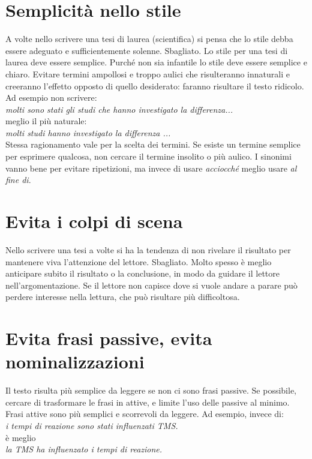 \documentclass[12pt]{book}
\begin{document}
\section{Semplicità nello stile}
A volte nello scrivere una tesi di laurea (scientifica) si pensa che lo stile debba essere adeguato e sufficientemente solenne. Sbagliato. Lo stile per una tesi di laurea deve essere semplice. Purché non sia infantile lo stile deve essere semplice e chiaro. Evitare termini ampollosi e troppo aulici che risulteranno innaturali e creeranno l'effetto opposto di quello desiderato: faranno risultare il testo ridicolo.\\
Ad esempio non scrivere:\\
\newline
\indent \emph{molti sono stati gli studi che hanno investigato la differenza...}\\
\newline
meglio il più naturale:\\
\newline
\indent \emph{molti studi hanno investigato la differenza ...}\\
\newline
Stessa ragionamento vale per la scelta dei termini. Se esiste un termine semplice per esprimere qualcosa, non cercare il termine insolito o più aulico. I sinonimi vanno bene per evitare ripetizioni, ma invece di usare \emph{acciocché} meglio usare \emph{al fine di}.

\section{Evita i colpi di scena}
Nello scrivere una tesi a volte si ha la tendenza di non rivelare il risultato per mantenere viva l'attenzione del lettore. Sbagliato. Molto spesso è meglio anticipare subito il risultato o la conclusione, in modo da guidare il lettore nell'argomentazione. Se il lettore non capisce dove si vuole andare a parare può perdere interesse nella lettura, che può risultare più difficoltosa.


\section{Evita frasi passive, evita nominalizzazioni}
Il testo risulta più semplice da leggere se non ci sono frasi passive. Se possibile, cercare di trasformare le frasi in attive, e limite l'uso delle passive al minimo. Frasi attive sono più semplici e scorrevoli da leggere. Ad esempio, invece di:\\\newline
\indent \emph{i tempi di reazione sono stati influenzati TMS.}\\\newline
è meglio \\\newline
\indent \emph{la TMS ha influenzato i tempi di reazione.}\\\newline
\end{document}
